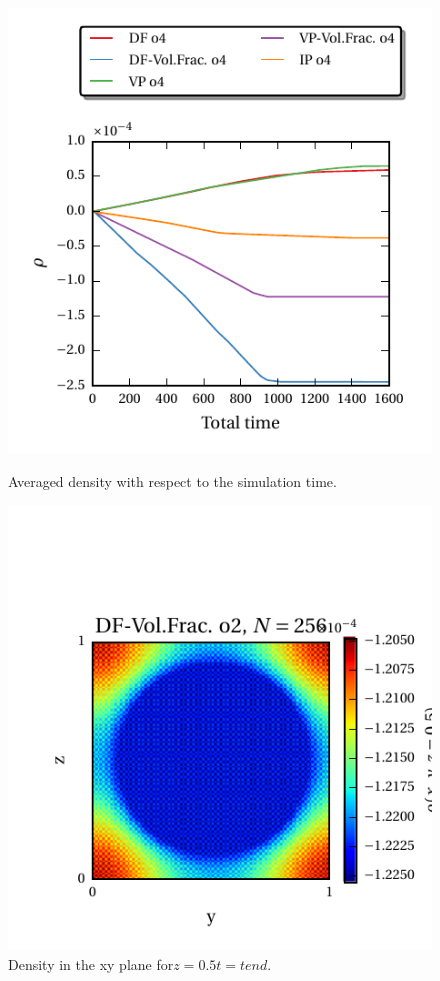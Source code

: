 \begin{figure}[!bp]
  \begin{minipage}[c]{0.5\textwidth}
      \includegraphics{gfx/immersed_boundary/hpflow/long/ts.pdf}
      \caption{\label{hpflow:results_long_ts}
            Averaged density with respect to the simulation time.
          }
  \end{minipage}
  \begin{minipage}[c]{0.5\textwidth}
      \includegraphics{gfx/immersed_boundary/hpflow/long/example.pdf}
      \caption{\label{hpflow:results_long_example}
        Density in the xy plane for$ z = 0.5 t = tend$.
      }
  \end{minipage}
\end{figure}


